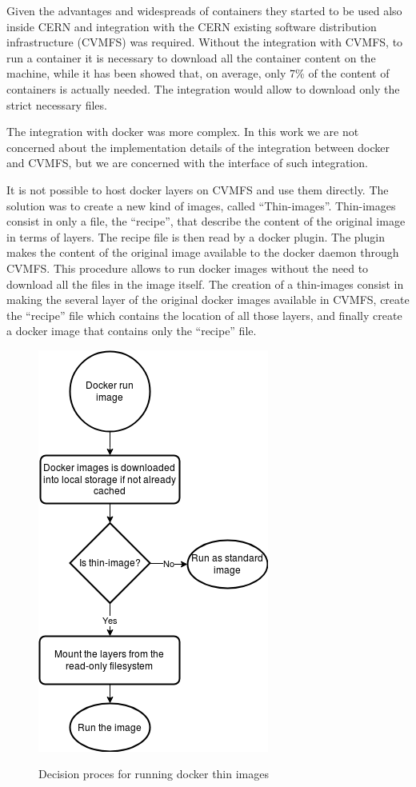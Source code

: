 Given the advantages and widespreads of containers they started to be used also
inside CERN and integration with the CERN existing software distribution
infrastructure (CVMFS) was required.  Without the integration with CVMFS, to
run a container it is necessary to download all the container content on the
machine, while it has been showed that, on average, only 7\% of the content of
containers is actually needed.  The integration would allow to download only
the strict necessary files.

The integration with docker was more complex. In this work we are not concerned
about the implementation details of the integration between docker and CVMFS,
but we are concerned with the interface of such integration.

It is not possible to host docker layers on CVMFS and use them directly. The
solution was to create a new kind of images, called “Thin-images”.  Thin-images
consist in only a file, the “recipe”, that describe the content of the original
image in terms of layers.  The recipe file is then read by a docker plugin. The
plugin makes the content of the original image available to the docker daemon
through CVMFS. This procedure allows to run docker images without the need to
download all the files in the image itself.  The creation of a thin-images
consist in making the several layer of the original docker images available in
CVMFS, create the “recipe” file which contains the location of all those
layers, and finally create a docker image that contains only the “recipe” file.

\begin{figure}
\includegraphics{gfx/RunThinImages}
\label{fig:flowchart-run-thin-image}
\caption{Decision proces for running docker thin images}
\end{figure}

